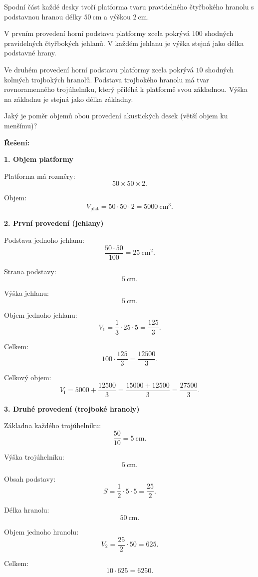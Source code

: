 \documentclass[12pt,a4paper]{article}
\begin{document}
Spodní část každé desky tvoří platforma tvaru pravidelného čtyřbokého hranolu s podstavnou hranou délky \(50\ \mathrm{cm}\) a výškou \(2\ \mathrm{cm}\).

V prvním provedení horní podstavu platformy zcela pokrývá \(100\) shodných pravidelných čtyřbokých jehlanů. V každém jehlanu je výška stejná jako délka podstavné hrany.

Ve druhém provedení horní podstavu platformy zcela pokrývá \(10\) shodných kolmých trojbokých hranolů. Podstava trojbokého hranolu má tvar rovnoramenného trojúhelníku, který přiléhá k platformě svou základnou. Výška na základnu je stejná jako délka základny.

Jaký je poměr objemů obou provedení akustických desek (větší objem ku menšímu)?

\bigskip

\textbf{Řešení:}

\textbf{1. Objem platformy}

Platforma má rozměry:
\[
50\times 50 \times 2.
\]

Objem:
\[
V_{\text{plat}}=50\cdot 50 \cdot 2 = 5000\ \mathrm{cm}^3.
\]

\medskip

\textbf{2. První provedení (jehlany)}

Podstava jednoho jehlanu:
\[
\frac{50\cdot 50}{100}=25\ \mathrm{cm}^2.
\]

Strana podstavy:
\[
5\ \mathrm{cm}.
\]

Výška jehlanu:
\[
5\ \mathrm{cm}.
\]

Objem jednoho jehlanu:
\[
V_1=\frac{1}{3}\cdot 25 \cdot 5=\frac{125}{3}.
\]

Celkem:
\[
100\cdot \frac{125}{3}=\frac{12500}{3}.
\]

Celkový objem:
\[
V_{\text{I}}=5000+\frac{12500}{3}
=\frac{15000+12500}{3}
=\frac{27500}{3}.
\]

\medskip

\textbf{3. Druhé provedení (trojboké hranoly)}

Základna každého trojúhelníku:
\[
\frac{50}{10}=5\ \mathrm{cm}.
\]

Výška trojúhelníku:
\[
5\ \mathrm{cm}.
\]

Obsah podstavy:
\[
S=\frac{1}{2}\cdot 5\cdot 5=\frac{25}{2}.
\]

Délka hranolu:
\[
50\ \mathrm{cm}.
\]

Objem jednoho hranolu:
\[
V_2=\frac{25}{2}\cdot 50=625.
\]

Celkem:
\[
10\cdot 625=6250.
\]
\end{document}
